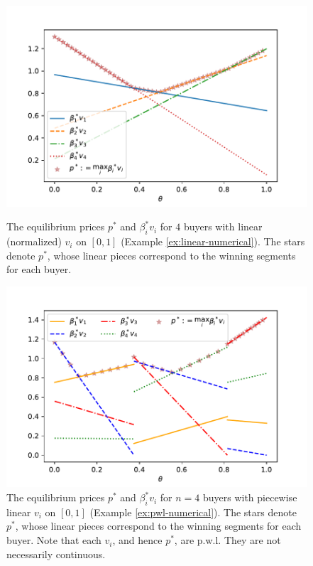 \begin{figure}
\begin{minipage}{0.48\textwidth}
	\centering
	\includegraphics[scale=0.5]{codes/n-linear.pdf}
	\caption{The equilibrium prices $p^*$ and $\beta^*_i v_i$ for $4$ buyers with linear (normalized) $v_i$ on $[0,1]$ (Example \ref{ex:linear-numerical}). 
	The stars denote $p^*$, whose linear pieces correspond to the winning segments for each buyer.
	}
	\label{fig:n-linear}
\end{minipage}\hfill
\begin{minipage}{0.48\textwidth}
	\centering
	\includegraphics[scale=0.5]{codes/n-pwl.pdf}
	\caption{The equilibrium prices $p^*$ and $\beta^*_i v_i$ for $n=4$ buyers with piecewise linear $v_i$ on $[0,1]$ (Example \ref{ex:pwl-numerical}). The stars denote $p^*$, whose linear pieces correspond to the winning segments for each buyer.
	Note that each $v_i$, and hence $p^*$, are p.w.l. They are not necessarily continuous.}
	\label{fig:n-pwl}
\end{minipage}
\end{figure}

